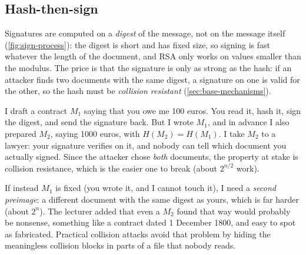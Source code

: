\subsection{Hash-then-sign}

Signatures are computed on a \emph{digest} of the message, not on the message itself (\cref{fig:sign-process}): the digest is short and has fixed size, so signing is fast whatever the length of the document, and RSA only works on values smaller than the modulus. The price is that the signature is only as strong as the hash: if an attacker finds two documents with the same digest, a signature on one is valid for the other, so the hash must be \emph{collision resistant} (\cref{sec:base-mechanisms}).

\begin{example}
I draft a contract $M_1$ saying that you owe me 100 euros. You read it, hash it, sign the digest, and send the signature back. But I wrote $M_1$, and in advance I also prepared $M_2$, saying 1000 euros, with $H(M_2) = H(M_1)$. I take $M_2$ to a lawyer: your signature verifies on it, and nobody can tell which document you actually signed. Since the attacker chose \emph{both} documents, the property at stake is collision resistance, which is the easier one to break (about $2^{n/2}$ work).

If instead $M_1$ is fixed (you wrote it, and I cannot touch it), I need a \emph{second preimage}: a different document with the same digest as yours, which is far harder (about $2^{n}$). The lecturer added that even a $M_2$ found that way would probably be nonsense, something like a contract dated 1 December 1800, and easy to spot as fabricated. Practical collision attacks avoid that problem by hiding the meaningless collision blocks in parts of a file that nobody reads.
\end{example}

